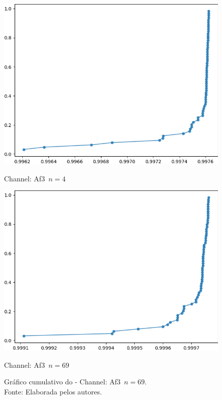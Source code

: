 \begin{figure}[ht]

  \begin{minipage}[b]{0.45\textwidth}
    \includegraphics[width=\textwidth]{../Figures/test_dmc/pdcca_of_Af3._n_4.png}
    \caption{Channel: Af3~$n = 4$}
  \end{minipage}
  \hfill
  \begin{minipage}[b]{0.45\textwidth}
    \includegraphics[width=\textwidth]{../Figures/test_dmc/pdcca_of_Af3._n_69.png}
    \caption{Channel: Af3~$n = 69$}
  \end{minipage}
  \captionsetup{justification=centering}
  \caption{Gráfico cumulativo do \dmc - Channel: Af3~$n = 69$.\\Fonte: Elaborada pelos autores.}  \label{fig:cumula_af3}
\end{figure}

